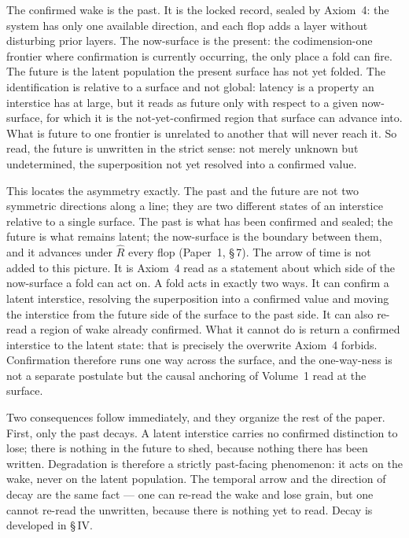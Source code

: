 \documentclass[11pt,oneside]{report}
\theoremstyle{definition}
\theoremstyle{remark}
\begin{document}
The confirmed wake is the past. It is the locked record, sealed by
Axiom~4: the system has only one available direction, and each flop adds
a layer without disturbing prior layers. The now-surface is the present:
the codimension-one frontier where confirmation is currently occurring,
the only place a fold can fire. The future is the latent population the
present surface has not yet folded. The identification is relative to a
surface and not global: latency is a property an interstice has at large,
but it reads as future only with respect to a given now-surface, for
which it is the not-yet-confirmed region that surface can advance into.
What is future to one frontier is unrelated to another that will never
reach it. So read, the future is unwritten in the strict sense: not
merely unknown but undetermined, the superposition not yet resolved into
a confirmed value.

This locates the asymmetry exactly. The past and the future are not two
symmetric directions along a line; they are two different states of an
interstice relative to a single surface. The past is what has been
confirmed and sealed; the future is what remains latent; the now-surface
is the boundary between them, and it advances under \ensuremath{\hat{R}}
every flop (Paper~1, \S\,7). The arrow of time is not added to this
picture. It is Axiom~4 read as a statement about which side of the
now-surface a fold can act on. A fold acts in exactly two ways. It can
confirm a latent interstice, resolving the superposition into a confirmed
value and moving the interstice from the future side of the surface to
the past side. It can also re-read a region of wake already confirmed.
What it cannot do is return a confirmed interstice to the latent state:
that is precisely the overwrite Axiom~4 forbids. Confirmation therefore
runs one way across the surface, and the one-way-ness is not a separate
postulate but the causal anchoring of Volume~1 read at the surface.

Two consequences follow immediately, and they organize the rest of the
paper. First, only the past decays. A latent interstice carries no
confirmed distinction to lose; there is nothing in the future to shed,
because nothing there has been written. Degradation is therefore a
strictly past-facing phenomenon: it acts on the wake, never on the latent
population. The temporal arrow and the direction of decay are the same
fact --- one can re-read the wake and lose grain, but one cannot re-read
the unwritten, because there is nothing yet to read. Decay is developed in
\S\,IV.
\end{document}
